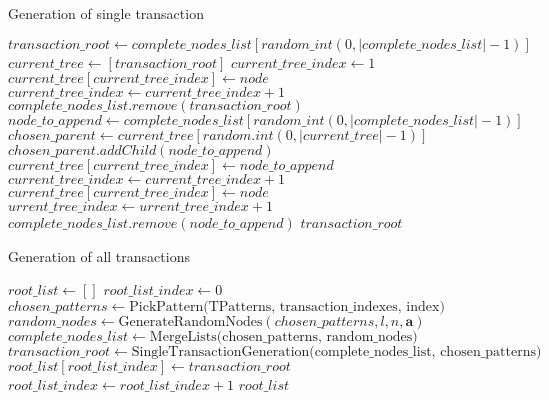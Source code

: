 \documentclass{acm_proc_article-sp-sigmod09}
\begin{document}
\begin{algorithm}
\caption{Generation of single transaction}
\label{transaction_generation}
\begin{algorithmic}[1]
\State $transaction\_root \gets complete\_nodes\_list[random\_int(0, |complete\_nodes\_list| - 1)]$
\State $current\_tree \gets [transaction\_root]$
\State $current\_tree\_index \gets 1$
        \State $current\_tree[current\_tree\_index] \gets node$
        \State $current\_tree\_index \gets current\_tree\_index + 1$
    \EndFor
\EndIf
\State $complete\_nodes\_list.remove(transaction\_root)$
    \State $node\_to\_append \gets complete\_nodes\_list[random\_int(0, |complete\_nodes\_list| - 1)]$
    \State $chosen\_parent \gets current\_tree[random.int(0, |current\_tree| - 1)]$
    \State $chosen\_parent.addChild(node\_to\_append)$
    \State $current\_tree[current\_tree\_index] \gets node\_to\_append$
    \State $current\_tree\_index \gets current\_tree\_index + 1$
            \State $current\_tree[current\_tree\_index] \gets node$
            \State $urrent\_tree\_index \gets urrent\_tree\_index + 1$
        \EndFor
    \EndIf
    \State $complete\_nodes\_list.remove(node\_to\_append)$
\EndFor
\Return $transaction\_root$
\EndFunction
\end{algorithmic}
\end{algorithm}

\begin{algorithm}
\caption{Generation of all transactions}
\label{complete_transaction_generation}
\begin{algorithmic}[1]
\State $root\_list \gets []$
\State $root\_list\_index \gets 0$
    \State $chosen\_patterns \gets \text{PickPattern(TPatterns, transaction\_indexes, index)}$
    \State $random\_nodes \gets \text{GenerateRandomNodes}(chosen\_patterns, l, n, \boldsymbol{a})$
    \State $complete\_nodes\_list \gets \text{MergeLists(chosen\_patterns, random\_nodes)}$
    \State $transaction\_root \gets \text{SingleTransactionGeneration(complete\_nodes\_list, chosen\_patterns)}$
    \State $root\_list[root\_list\_index] \gets transaction\_root$
    \State $root\_list\_index \gets root\_list\_index + 1$
\EndFor
\Return $root\_list$
\EndFunction
\end{algorithmic}
\end{algorithm}
\end{document}
